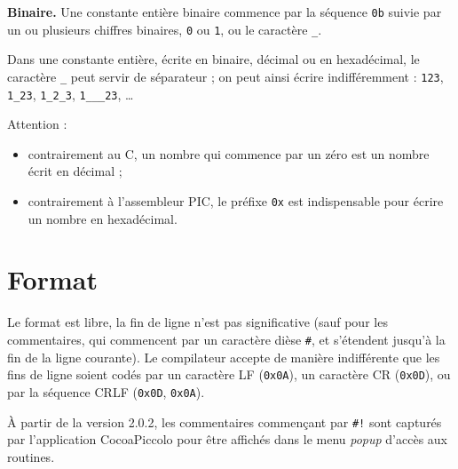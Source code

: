 \textbf{Binaire.} Une constante entière binaire commence par la séquence \texttt{0b} suivie par un ou plusieurs chiffres binaires, \texttt{0} ou \texttt{1}, ou le caractère \texttt{\_}.

Dans une constante entière, écrite en binaire, décimal ou en hexadécimal, le caractère \texttt{\_} peut servir de séparateur ; on peut ainsi écrire indifféremment : \texttt{123}, \texttt{1\_23}, \texttt{1\_2\_3}, \texttt{1\_\_\_23}, \dots

Attention :
\begin{itemize}
  \item contrairement au C, un nombre qui commence par un zéro est un nombre écrit en décimal ;
  \item contrairement à l’assembleur PIC, le préfixe \texttt{0x} est indispensable pour écrire un nombre en hexadécimal.
\end{itemize}

\section{Format}

Le format est libre, la fin de ligne n’est pas significative (sauf pour les commentaires, qui commencent par un caractère dièse \texttt{\#}, et s’étendent jusqu’à la fin de la ligne courante). Le compilateur accepte de manière indifférente que les fins de ligne soient codés par un caractère LF (\texttt{0x0A}), un caractère CR (\texttt{0x0D}), ou par la séquence CRLF (\texttt{0x0D}, \texttt{0x0A}).

À partir de la version 2.0.2, les commentaires commençant par \texttt{\#!} sont capturés par l'application CocoaPiccolo pour être affichés dans le menu \emph{popup} d'accès aux routines.


